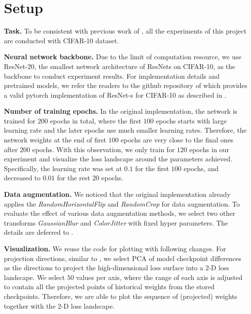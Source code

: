 \section{Setup}
\label{sec:setup}

\textbf{Task.} 
To be consistent with previous work of \cite{li2018visualizing}, all the experiments of this project are conducted with CIFAR-10 dataset.   

\textbf{Neural network backbone.} 
Due to the limit of computation resource, we use ResNet-20, the smallest network architecture of ResNets on CIFAR-10,  as the backbone to conduct experiment results. 
For implementation details and pretrained models, we refer the readers to the github repository of \cite{Idelbayev18a} which provides a valid pytorch implementation of ResNet-s for CIFAR-10 as described in \cite{he2016deep}.

\textbf{Number of training epochs.} 
In the original implementation, the network is trained for $200$ epochs in total, where the first $100$ epochs starts with large learning rate and the later epochs use much smaller learning rates. 
Therefore, the network weights at the end of first $100$ epochs are very close to the final ones after $200$ epochs. 
With this observation, we only train for $120$ epochs in our experiment and visualize the loss landscape around the parameters achieved. 
Specifically, the learning rate was set at $0.1$ for the first $100$ epochs, and decreased to $0.01$ for the rest $20$ epochs. 

\textbf{Data augmentation.} 
We noticed that the original implementation already applies the \textit{RandomHorizontalFlip} and \textit{RandomCrop} for data augmentation. 
To evaluate the effect of various data augmentation methods, we select two other transforms \textit{GaussianBlur} and \textit{ColorJitter} with fixed hyper parameters. 
The details are deferred to . 

\textbf{Visualization.}
We reuse the code for plotting with following changes. For projection directions, similar to \cite{li2018visualizing}, we select PCA of model checkpoint differences as the directions to project the high-dimensional loss surface into a 2-D loss landscape. 
We select $50$ values per axis, where the range of each axis is adjusted to contain all the projected points of historical weights from the stored checkpoints. 
Therefore, we are able to plot the sequence of (projected) weights together with the 2-D loss landscape. 


